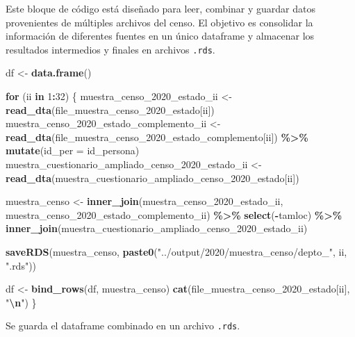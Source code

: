 \documentclass[
  12pt,
]{book}
\newenvironment{Shaded}{\begin{snugshade}}{\end{snugshade}}
\newcommand{\AttributeTok}[1]{\textcolor[rgb]{0.13,0.29,0.53}{#1}}
\newcommand{\ControlFlowTok}[1]{\textcolor[rgb]{0.13,0.29,0.53}{\textbf{#1}}}
\newcommand{\DecValTok}[1]{\textcolor[rgb]{0.00,0.00,0.81}{#1}}
\newcommand{\FunctionTok}[1]{\textcolor[rgb]{0.13,0.29,0.53}{\textbf{#1}}}
\newcommand{\NormalTok}[1]{#1}
\newcommand{\OtherTok}[1]{\textcolor[rgb]{0.56,0.35,0.01}{#1}}
\newcommand{\SpecialCharTok}[1]{\textcolor[rgb]{0.81,0.36,0.00}{\textbf{#1}}}
\newcommand{\StringTok}[1]{\textcolor[rgb]{0.31,0.60,0.02}{#1}}
\begin{document}
Este bloque de código está diseñado para leer, combinar y guardar datos provenientes de múltiples archivos del censo. El objetivo es consolidar la información de diferentes fuentes en un único dataframe y almacenar los resultados intermedios y finales en archivos \texttt{.rds}.

\begin{Shaded}
\begin{Highlighting}[]
\NormalTok{df }\OtherTok{\textless{}{-}} \FunctionTok{data.frame}\NormalTok{()}

\ControlFlowTok{for}\NormalTok{ (ii }\ControlFlowTok{in} \DecValTok{1}\SpecialCharTok{:}\DecValTok{32}\NormalTok{) \{}
\NormalTok{  muestra\_censo\_2020\_estado\_ii }\OtherTok{\textless{}{-}}
    \FunctionTok{read\_dta}\NormalTok{(file\_muestra\_censo\_2020\_estado[ii])}
\NormalTok{  muestra\_censo\_2020\_estado\_complemento\_ii }\OtherTok{\textless{}{-}}
    \FunctionTok{read\_dta}\NormalTok{(file\_muestra\_censo\_2020\_estado\_complemento[ii]) }\SpecialCharTok{\%\textgreater{}\%}
    \FunctionTok{mutate}\NormalTok{(}\AttributeTok{id\_per =}\NormalTok{ id\_persona)}
\NormalTok{  muestra\_cuestionario\_ampliado\_censo\_2020\_estado\_ii }\OtherTok{\textless{}{-}}
    \FunctionTok{read\_dta}\NormalTok{(muestra\_cuestionario\_ampliado\_censo\_2020\_estado[ii])}
  
\NormalTok{  muestra\_censo }\OtherTok{\textless{}{-}}
    \FunctionTok{inner\_join}\NormalTok{(muestra\_censo\_2020\_estado\_ii,}
\NormalTok{               muestra\_censo\_2020\_estado\_complemento\_ii) }\SpecialCharTok{\%\textgreater{}\%}
    \FunctionTok{select}\NormalTok{(}\SpecialCharTok{{-}}\NormalTok{tamloc) }\SpecialCharTok{\%\textgreater{}\%}
    \FunctionTok{inner\_join}\NormalTok{(muestra\_cuestionario\_ampliado\_censo\_2020\_estado\_ii)}
  
  \FunctionTok{saveRDS}\NormalTok{(muestra\_censo,}
          \FunctionTok{paste0}\NormalTok{(}\StringTok{"../output/2020/muestra\_censo/depto\_"}\NormalTok{, ii, }\StringTok{".rds"}\NormalTok{))}
  
\NormalTok{  df }\OtherTok{\textless{}{-}} \FunctionTok{bind\_rows}\NormalTok{(df, muestra\_censo)}
  \FunctionTok{cat}\NormalTok{(file\_muestra\_censo\_2020\_estado[ii], }\StringTok{"}\SpecialCharTok{\textbackslash{}n}\StringTok{"}\NormalTok{)}
\NormalTok{\}}
\end{Highlighting}
\end{Shaded}

Se guarda el dataframe combinado en un archivo \texttt{.rds}.
\end{document}
